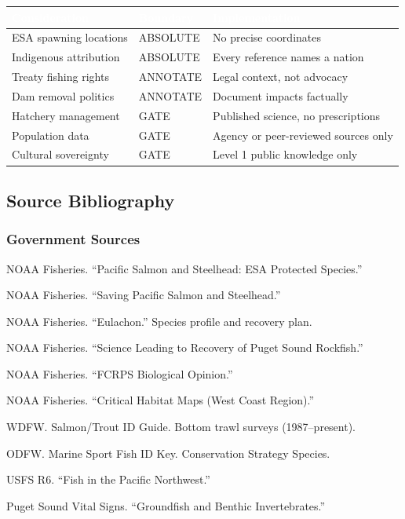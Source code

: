 \documentclass[11pt,letterpaper]{article}
\newcommand{\tableheader}[1]{\textbf{\sffamily\textcolor{white}{#1}}}
\begin{document}
\begin{center}
\begin{tabularx}{\textwidth}{L{3.5cm}C{2cm}X}
\toprule
{}
\tableheader{Consideration} & \tableheader{Boundary} & \tableheader{Implementation} \\
\midrule
ESA spawning locations & ABSOLUTE & No precise coordinates \\
Indigenous attribution & ABSOLUTE & Every reference names a nation \\
Treaty fishing rights & ANNOTATE & Legal context, not advocacy \\
Dam removal politics & ANNOTATE & Document impacts factually \\
Hatchery management & GATE & Published science, no prescriptions \\
Population data & GATE & Agency or peer-reviewed sources only \\
Cultural sovereignty & GATE & Level 1 public knowledge only \\
\bottomrule
\end{tabularx}
\end{center}

\subsection{Source Bibliography}

\subsubsection{Government Sources}
\begin{enumerate}[leftmargin=2em, label={[G\arabic*]}]
\item NOAA Fisheries. ``Pacific Salmon and Steelhead: ESA Protected Species.''
\item NOAA Fisheries. ``Saving Pacific Salmon and Steelhead.''
\item NOAA Fisheries. ``Eulachon.'' Species profile and recovery plan.
\item NOAA Fisheries. ``Science Leading to Recovery of Puget Sound Rockfish.''
\item NOAA Fisheries. ``FCRPS Biological Opinion.''
\item NOAA Fisheries. ``Critical Habitat Maps (West Coast Region).''
\item WDFW. Salmon/Trout ID Guide. Bottom trawl surveys (1987--present).
\item ODFW. Marine Sport Fish ID Key. Conservation Strategy Species.
\item USFS R6. ``Fish in the Pacific Northwest.''
\item Puget Sound Vital Signs. ``Groundfish and Benthic Invertebrates.''
\end{enumerate}
\end{document}
